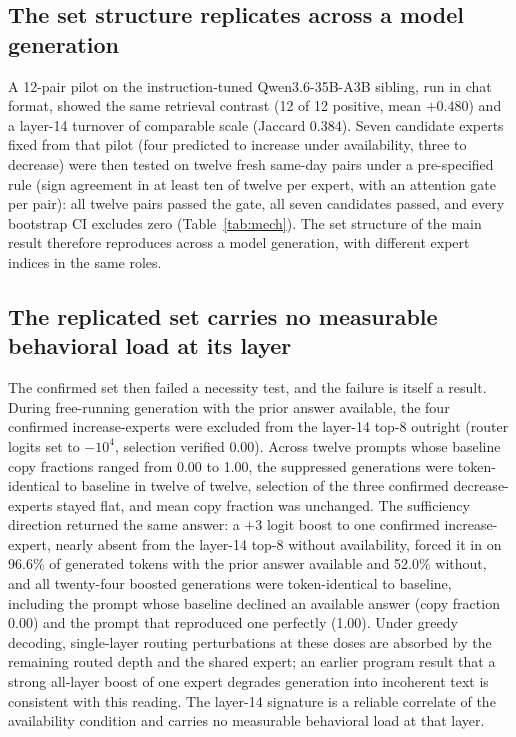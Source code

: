 \documentclass[10pt,a4paper,twocolumn]{article}
\begin{document}
\subsection{The set structure replicates across a model generation}

A 12-pair pilot on the instruction-tuned Qwen3.6-35B-A3B sibling, run in chat
format, showed the same retrieval contrast (12 of 12 positive, mean
\(+0.480\)) and a layer-14 turnover of comparable scale (Jaccard 0.384). Seven
candidate experts fixed from that pilot (four predicted to increase under
availability, three to decrease) were then tested on twelve fresh same-day
pairs under a pre-specified rule (sign agreement in at least ten of twelve per
expert, with an attention gate per pair): all twelve pairs passed the gate,
all seven candidates passed, and every bootstrap CI excludes zero
(Table~\ref{tab:mech}). The set structure of the main result therefore
reproduces across a model generation, with different expert indices in the
same roles.

\subsection{The replicated set carries no measurable behavioral load at its layer}

The confirmed set then failed a necessity test, and the failure is itself a
result. During free-running generation with the prior answer available, the
four confirmed increase-experts were excluded from the layer-14 top-8 outright
(router logits set to \(-10^{4}\), selection verified 0.00). Across twelve
prompts whose baseline copy fractions ranged from 0.00 to 1.00, the
suppressed generations were token-identical to baseline in twelve of twelve,
selection of the three confirmed decrease-experts stayed flat, and mean copy
fraction was unchanged. The sufficiency direction returned the same answer: a
\(+3\) logit boost to one confirmed increase-expert, nearly absent from the
layer-14 top-8 without availability, forced it in on 96.6\% of generated
tokens with the prior answer available and 52.0\% without, and all
twenty-four boosted generations were token-identical to baseline, including
the prompt whose baseline declined an available answer (copy fraction 0.00)
and the prompt that reproduced one perfectly (1.00). Under greedy decoding,
single-layer routing perturbations at these doses are absorbed by the
remaining routed depth and the shared expert; an earlier program result that
a strong all-layer boost of one expert degrades generation into incoherent
text is consistent with this reading. The layer-14 signature is a reliable
correlate of the availability condition and carries no measurable behavioral
load at that layer.
\end{document}
